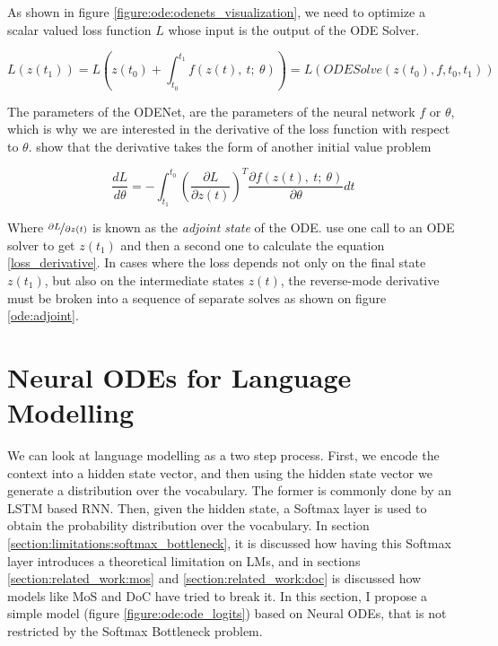 As shown in figure \ref{figure:ode:odenets_visualization}, we need to optimize a scalar valued loss function $ L $ whose input is the output of the ODE Solver.

\begin{equation}
    L(z(t_1)) = L \left( z(t_0) + \int_{t_0}^{t_1} f(z(t), \ t; \ \theta ) \right) = L(ODESolve(z(t_0), f, t_0, t_1))
\end{equation}

The parameters of the ODENet, are the parameters of the neural network $ f $ or $ \theta $, which is why we are interested in the derivative of the loss function with respect to $ \theta $. \citet{pontryagin2018mathematical} show that the derivative takes the form of another initial value problem

\begin{equation}
    \label{loss_derivative}
    \frac{dL}{d\theta} = - \int_{t_1}^{t_0} \left(\frac{\partial L}{\partial z(t)}\right)^T \frac{\partial f(z(t), \ t; \ \theta)}{\partial \theta}dt
\end{equation}

Where $ \nicefrac{\partial L}{\partial z(t)} $ is known as the \emph{adjoint state} of the ODE. \citet{chen2018neural} use one call to an ODE solver to get $ z(t_1) $ and then a second one to calculate the equation \ref{loss_derivative}. In cases where the loss depends not only on the final state $ z(t_1) $, but also on the intermediate states $ z(t) $, the reverse-mode derivative must be broken into a sequence of separate solves as shown on figure \ref{ode:adjoint}.

\section{Neural ODEs for Language Modelling}
\label{section:ode:ode_lms}

We can look at language modelling as a two step process. First, we encode the context into a hidden state vector, and then using the hidden state vector we generate a distribution over the vocabulary. The former is commonly done by an LSTM based RNN. Then, given the hidden state, a Softmax layer is used to obtain the probability distribution over the vocabulary. In section \ref{section:limitations:softmax_bottleneck}, it is discussed how having this Softmax layer introduces a theoretical limitation on LMs, and in sections \ref{section:related_work:mos} and \ref{section:related_work:doc} is discussed how models like MoS \citep{yang2017breaking} and DoC \citep{takase2018direct} have tried to break it. In this section, I propose a simple model (figure \ref{figure:ode:ode_logits}) based on Neural ODEs, that is not restricted by the Softmax Bottleneck problem.

